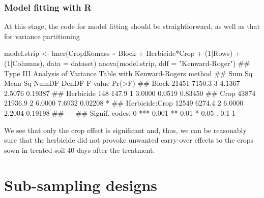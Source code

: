 \documentclass[a4paper,12pt,oneside]{book}
\newenvironment{Shaded}{\begin{snugshade}}{\end{snugshade}}
\newcommand{\DecValTok}[1]{#1}
\newcommand{\SpecialCharTok}[1]{#1}
\newcommand{\StringTok}[1]{#1}
\newcommand{\DocumentationTok}[1]{#1}
\newcommand{\OtherTok}[1]{#1}
\newcommand{\FunctionTok}[1]{#1}
\newcommand{\AttributeTok}[1]{#1}
\newcommand{\NormalTok}[1]{#1}
\begin{document}
\hypertarget{model-fitting-with-r-3}{%
\subsubsection{Model fitting with R}\label{model-fitting-with-r-3}}

At this stage, the code for model fitting should be straightforward, as well as that for variance partitioning

\begin{Shaded}
\begin{Highlighting}[]
\NormalTok{model.strip }\OtherTok{\textless{}{-}} \FunctionTok{lmer}\NormalTok{(CropBiomass }\SpecialCharTok{\textasciitilde{}}\NormalTok{ Block }\SpecialCharTok{+}\NormalTok{ Herbicide}\SpecialCharTok{*}\NormalTok{Crop }\SpecialCharTok{+} 
\NormalTok{    (}\DecValTok{1}\SpecialCharTok{|}\NormalTok{Rows) }\SpecialCharTok{+}\NormalTok{ (}\DecValTok{1}\SpecialCharTok{|}\NormalTok{Columns), }\AttributeTok{data =}\NormalTok{ dataset)}
\FunctionTok{anova}\NormalTok{(model.strip, }\AttributeTok{ddf =} \StringTok{"Kenward{-}Roger"}\NormalTok{)}
\DocumentationTok{\#\# Type III Analysis of Variance Table with Kenward{-}Roger\textquotesingle{}s method}
\DocumentationTok{\#\#                Sum Sq Mean Sq NumDF  DenDF F value  Pr(\textgreater{}F)  }
\DocumentationTok{\#\# Block           21451  7150.3     3 4.1367  2.5076 0.19387  }
\DocumentationTok{\#\# Herbicide         148   147.9     1 3.0000  0.0519 0.83450  }
\DocumentationTok{\#\# Crop            43874 21936.9     2 6.0000  7.6932 0.02208 *}
\DocumentationTok{\#\# Herbicide:Crop  12549  6274.4     2 6.0000  2.2004 0.19198  }
\DocumentationTok{\#\# {-}{-}{-}}
\DocumentationTok{\#\# Signif. codes:  0 \textquotesingle{}***\textquotesingle{} 0.001 \textquotesingle{}**\textquotesingle{} 0.01 \textquotesingle{}*\textquotesingle{} 0.05 \textquotesingle{}.\textquotesingle{} 0.1 \textquotesingle{} \textquotesingle{} 1}
\end{Highlighting}
\end{Shaded}

We see that only the crop effect is significant and, thus, we can be reasonably sure that the herbicide did not provoke unwanted carry-over effects to the crops sown in treated soil 40 days after the treatment.

\hypertarget{sub-sampling-designs}{%
\section{Sub-sampling designs}\label{sub-sampling-designs}}
\end{document}

